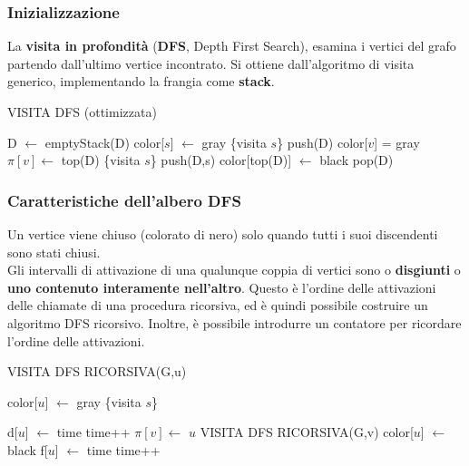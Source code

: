 \documentclass[11pt]{article}
\begin{document}
\subsubsection{Inizializzazione}
La \textbf{visita in profondità} (\textbf{DFS}, Depth First Search), esamina i vertici del grafo partendo dall'ultimo 
vertice incontrato. Si ottiene dall'algoritmo di visita generico, implementando la frangia come \textbf{stack}.
\begin{algorithm}
    \caption{VISITA DFS (ottimizzata)}
    \begin{algorithmic}
        \State D $\gets$ emptyStack(D)
        \State color[$s$] $\gets$ gray
        \State \{visita $s$\}
        \State push(D)
                \State color[$v$] = gray 
                \State $\pi[v] \gets$ top(D) 
                \State \{visita $s$\}
                \State push(D,s)
            \EndIf 
            \State color[top(D)] $\gets$ black
            \State pop(D)
        \EndWhile
    \end{algorithmic}
\end{algorithm}
\subsubsection{Caratteristiche dell'albero DFS}
Un vertice viene chiuso (colorato di nero) solo quando tutti i suoi discendenti sono stati chiusi.\\
Gli intervalli di attivazione di una qualunque coppia di vertici sono o \textbf{disgiunti} o \textbf{uno contenuto interamente 
nell'altro}. Questo è l'ordine delle attivazioni delle chiamate di una procedura ricorsiva, ed è quindi possibile costruire 
un algoritmo DFS ricorsivo. Inoltre, è possibile introdurre un contatore per ricordare l'ordine delle attivazioni.
\begin{algorithm}[H]
    \caption{VISITA DFS RICORSIVA(G,u)}
    \begin{algorithmic}
        \State color[$u$] $\gets$ gray
        \State \{visita $s$\}
    \end{algorithmic}
\end{algorithm}
\begin{algorithm}[H]
    \begin{algorithmic}
        \State d[$u$] $\gets$ time
        \State time++
                \State $\pi[v] \gets$ $u$
                \State VISITA DFS RICORSIVA(G,v)
            \EndIf 
            \State color[$u$] $\gets$ black
            \State f[$u$] $\gets$ time
            \State time++
        \EndFor
    \end{algorithmic}
\end{algorithm}
\end{document}
